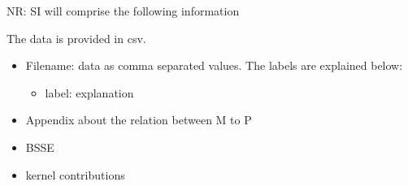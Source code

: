 \documentclass[journal=jctcce,manuscript=article]{achemso}
\begin{document}
%



\begin{suppinfo}
{\color{red} NR: 
SI will comprise the following information

The data is provided in csv.
\begin{itemize}
  \item Filename: data as comma separated values. The labels are explained below:
  \begin{itemize}
   \item label: explanation
  \end{itemize}
  \item Appendix about the relation between M to P
  \item BSSE
  \item kernel contributions
\end{itemize}
}
\end{suppinfo}




\end{document}
